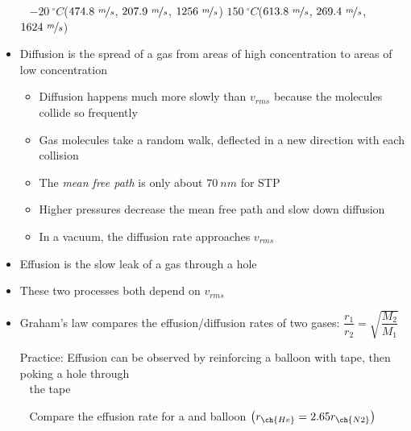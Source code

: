 \documentclass[12pt, openany, letterpaper]{memoir}
\begin{document}
\begin{itemize}
	      ~\hphantom{Practice: } $-20~^\circ C$($474.8~\nicefrac{m}{s}$, $207.9~\nicefrac{m}{s}$, $1256~\nicefrac{m}{s}$)\hspace{1em} $150~^\circ C$($613.8~\nicefrac{m}{s}$, $269.4~\nicefrac{m}{s}$, $1624~\nicefrac{m}{s}$)
	\item Diffusion is the spread of a gas from areas of high concentration to areas of low concentration
	      \begin{itemize}
		      \item Diffusion happens much more slowly than $v_{rms}$ because the molecules collide so frequently
		      \item Gas molecules take a random walk, deflected in a new direction with each collision
		      \item The \emph{mean free path} is only about $70~nm$ for STP
		      \item Higher pressures decrease the mean free path and slow down diffusion
		      \item In a vacuum, the diffusion rate approaches $v_{rms}$
	      \end{itemize}
	\item Effusion is the slow leak of a gas through a hole
	\item These two processes both depend on $v_{rms}$
	\item Graham's law compares the effusion/diffusion rates of two gases: $\dfrac{r_1}{r_2}=\sqrt{\dfrac{M_2}{M_1}}$

	      Practice: Effusion can be observed by reinforcing a balloon with tape, then poking a hole through\\
	      ~\hphantom{Practice: } the tape

	      ~\hphantom{Practice: } Compare the effusion rate for a  and  balloon $\left(r_{\ch{He}}=2.65r_{\ch{N2}}\right)$
\end{itemize}
\end{document}
